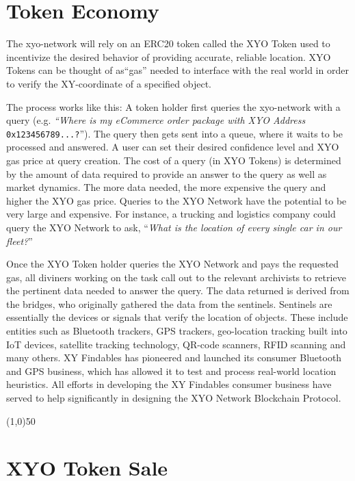 \documentclass{article}
\begin{document}
\section{Token Economy}

The \Gls{xyo-network} will rely on an ERC20 token called the XYO Token used to incentivize the desired behavior of providing accurate, reliable location. XYO Tokens can be thought of as``gas'' needed to interface with the real world in order to verify the XY-coordinate of a specified object.

The process works like this: A token holder first queries the \Gls{xyo-network} with a query (e.g. \textit{``Where is my eCommerce order package with XYO Address} \texttt{0x123456789...?}''). The query then gets sent into a queue, where it waits to be processed and answered. A user can set their desired confidence level and XYO gas price at query creation. The cost of a query (in XYO Tokens) is determined by the amount of data required to provide an answer to the query as well as market dynamics.  The more data needed, the more expensive the query and higher the XYO gas price. Queries to the XYO Network have the potential to be very large and expensive. For instance, a trucking and logistics company could query the XYO Network to ask, ``\textit{What is the location of every single car in our fleet?}''

Once the XYO Token holder queries the XYO Network and pays the requested gas, all \Glspl{diviner} working on the task call out to the relevant \Glspl{archivist} to retrieve the pertinent data needed to answer the query. The data returned is derived from the \Glspl{bridge}, who originally gathered the data from the \Glspl{sentinel}. Sentinels are essentially the devices or signals that verify the location of objects. These include entities such as Bluetooth trackers, GPS trackers, geo-location tracking built into IoT devices, satellite tracking technology, QR-code scanners, RFID scanning and many others. XY Findables has pioneered and launched its consumer Bluetooth and GPS business, which has allowed it to test and process real-world location \glspl{heuristic}. All efforts in developing the XY Findables consumer business have served to help significantly in designing the XYO Network Blockchain Protocol.

\begin{center}
\line(1,0){50}
\end{center}

\section{XYO Token Sale}
\end{document}
